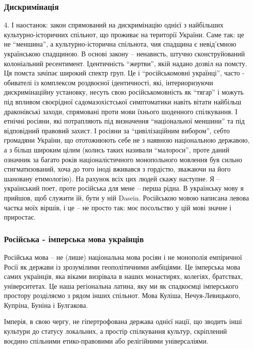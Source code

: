 \subsubsection{Дискримінація}

4. І наостанок: закон спрямований на дискримінацію однієї з найбільших
культурно-історичних спільнот, що проживає на території України. Саме так: це
не \enquote{меншина}, а культурно-історична спільнота, чия спадщина є невід'ємною
українською спадщиною. В основі закону – ненависть, штучно сконструйований
колоніальний ресентимент. Ідентичність \enquote{жертви}, якій надано дозвіл на помсту.
Ця помста зачіпає широкий спектр груп. Це і \enquote{російськомовні українці}, часто -
обивателі із комплексом роздвоєної ідентичності, які, інтериоризуючи
дискримінаційну установку, несуть свою російськомовність як \enquote{тягар} і можуть
під впливом своєрідної садомазохістської симптоматики навіть вітати найбільш
драконівські заходи, спрямовані проти мови їхнього шоденного спілкування. І
етнічні росіяни, які потрапляють під визначення \enquote{національної меншини} та під
відповідний правовий захист. І росіяни за \enquote{цивілізаційним вибором}, себто
громадяни України, що ототожнюють себе не з наявною національною державою, а з
більш широким цілим (колись таких називали \enquote{малороси}, проте даний означник за
багато років націоналістичного монопольного мовлення був сильно
стигматизований, хоча до того іноді вживався з гордістю, зважаючи на його
шановану етимологію). На рахунок всіх цих людей скажу наступне. Я – український
поет, проте російська для мене – перша рідна. В українську мову я прийшов, щоб
служити їй, бути у ній Dasein. Російською мовою написана левова частка моїх
віршів, і це – не просто так: моє посольство у цій мові значне і приростає.

\subsubsection{Російська - імперська мова українців}

Російська мова – не (лише) національна мова росіян і не монополія емпіричної
Росії як держави із зрозумілими геополітичними амбіціями. Це імперська мова
самих українців, яка віками визрівала в наших монастирях, колегіях, братствах,
університетах. Це наша регіональна латина, яку ми як спадкоємці імперського
простору розділяємо з рядом інших спільнот. Мова Куліша, Нечуя-Левицького,
Купріна, Буніна і Булгакова. 

Імперія, в свою чергу, не гіпертрофована держава
однієї нації, що зводить інші культури до статусу локальних, а простір
спілкування культур, скріплений воєдино спільними етико-правовими або
релігійними універсаліями. 

